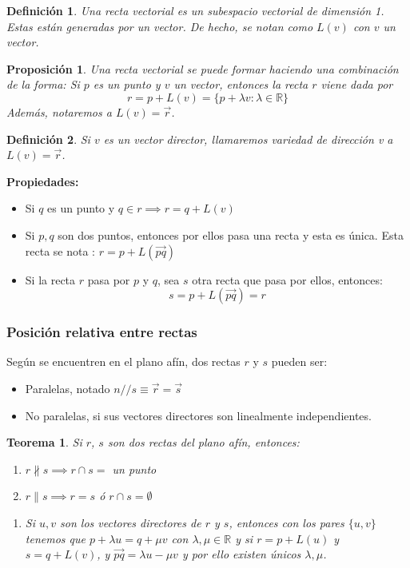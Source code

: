 \documentclass[11pt, a4paper, titlepage]{article}
\makeatletter
\renewenvironment{proof}[1][\proofname] {\vspace{-15pt}\par\pushQED{\qed}\normalfont\topsep6\p@\@plus6\p@\relax\trivlist\item[\hskip\labelsep\it#1\@addpunct{.}]\ignorespaces}{\popQED\endtrivlist\@endpefalse}
\newcommand{\R}{\mathbb{R}}
\theoremstyle{theorem-style}
\newtheorem*{nth}{Teorema}
\newtheorem*{nprop}{Proposición}
\theoremstyle{definition-style}
\newtheorem*{ndef}{Definición}
\theoremstyle{remark-style}
\theoremstyle{example-style}
\newenvironment{nlist}
{\begin{enumerate}
\renewcommand\labelenumi{(\emph{\roman{enumi})}}}
{\end{enumerate}}
\makeatother
\begin{document}
\begin{ndef}
	Una recta vectorial es un subespacio vectorial de dimensión 1. Estas están generadas por un vector. De hecho, se notan como $L(v)$ con $v$ un vector.
\end{ndef}

\begin{nprop}
	Una recta vectorial se puede formar haciendo una combinación de la forma: Si $p$ es un punto y $v$ un vector, entonces la recta $r$ viene dada por 
	\[
	r = p+L(v) = \{p + \lambda v : \lambda \in \R\}
	\]
	Además, notaremos a $L(v) = \vec{r}$.
\end{nprop}
\begin{ndef}
	Si $v$ es un vector director, llamaremos variedad de dirección v a $L(v) = \vec{r}$.
\end{ndef}

\textbf{Propiedades:}
\begin{itemize}
	\item Si $q$ es un punto y $q\in r \implies r = q +L(v)$
	\item Si $p,q$ son dos puntos, entonces por ellos pasa una recta y esta es única. Esta recta se nota : $r = p +L(\vec{pq})$\\
	\begin{proof}
	Si la recta $r$ pasa por $p$ y $q$, sea $s$ otra recta que pasa por ellos, entonces:
	\[
	s = p+L(\vec{pq}) = r
	\]
\end{proof}
\end{itemize}

\subsubsection{Posición relativa entre rectas}
Según se encuentren en el plano afín, dos rectas $r$ y $s$ pueden ser:
\begin{itemize}
	\item Paralelas, notado $n//s \equiv \vec{r} = \vec{s}$
	\item No paralelas, si sus vectores directores son linealmente independientes.
\end{itemize}

\begin{nth}
	Si $r$, $s$ son dos rectas del plano afín, entonces:
	\begin{nlist}
	\item $r \nparallel s\implies r \cap s = $ un punto
	\item $r \parallel s \implies r = s$ ó $r \cap s =  \emptyset$
\end{nlist}
\begin{proof}
	\begin{nlist}
	\item Si $u,v$ son los vectores directores de $r$ y $s$, entonces con los pares $\{u,v\}$ tenemos que $p+\lambda u = q + \mu v$ con $\lambda, \mu \in \R$
y si $r = p +L(u)$ y $s=q+L(v)$, y $\vec{pq} = \lambda u - \mu v $ y por ello existen únicos $\lambda, \mu$.
\end{nlist}
\end{proof}
\end{nth}
\end{document}
